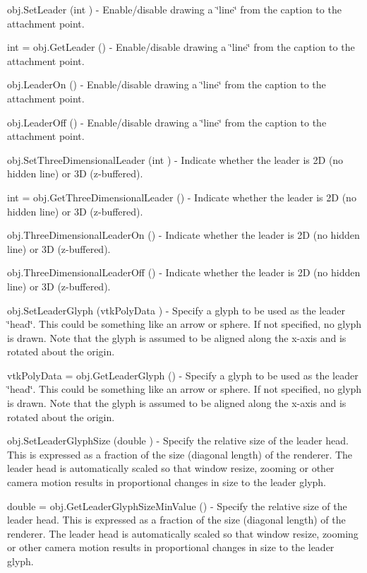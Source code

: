 \begin{DoxyItemize}
\item {\ttfamily obj.\-Set\-Leader (int )} -\/ Enable/disable drawing a \char`\"{}line\char`\"{} from the caption to the attachment point.  
\item {\ttfamily int = obj.\-Get\-Leader ()} -\/ Enable/disable drawing a \char`\"{}line\char`\"{} from the caption to the attachment point.  
\item {\ttfamily obj.\-Leader\-On ()} -\/ Enable/disable drawing a \char`\"{}line\char`\"{} from the caption to the attachment point.  
\item {\ttfamily obj.\-Leader\-Off ()} -\/ Enable/disable drawing a \char`\"{}line\char`\"{} from the caption to the attachment point.  
\item {\ttfamily obj.\-Set\-Three\-Dimensional\-Leader (int )} -\/ Indicate whether the leader is 2\-D (no hidden line) or 3\-D (z-\/buffered).  
\item {\ttfamily int = obj.\-Get\-Three\-Dimensional\-Leader ()} -\/ Indicate whether the leader is 2\-D (no hidden line) or 3\-D (z-\/buffered).  
\item {\ttfamily obj.\-Three\-Dimensional\-Leader\-On ()} -\/ Indicate whether the leader is 2\-D (no hidden line) or 3\-D (z-\/buffered).  
\item {\ttfamily obj.\-Three\-Dimensional\-Leader\-Off ()} -\/ Indicate whether the leader is 2\-D (no hidden line) or 3\-D (z-\/buffered).  
\item {\ttfamily obj.\-Set\-Leader\-Glyph (vtk\-Poly\-Data )} -\/ Specify a glyph to be used as the leader \char`\"{}head\char`\"{}. This could be something like an arrow or sphere. If not specified, no glyph is drawn. Note that the glyph is assumed to be aligned along the x-\/axis and is rotated about the origin.  
\item {\ttfamily vtk\-Poly\-Data = obj.\-Get\-Leader\-Glyph ()} -\/ Specify a glyph to be used as the leader \char`\"{}head\char`\"{}. This could be something like an arrow or sphere. If not specified, no glyph is drawn. Note that the glyph is assumed to be aligned along the x-\/axis and is rotated about the origin.  
\item {\ttfamily obj.\-Set\-Leader\-Glyph\-Size (double )} -\/ Specify the relative size of the leader head. This is expressed as a fraction of the size (diagonal length) of the renderer. The leader head is automatically scaled so that window resize, zooming or other camera motion results in proportional changes in size to the leader glyph.  
\item {\ttfamily double = obj.\-Get\-Leader\-Glyph\-Size\-Min\-Value ()} -\/ Specify the relative size of the leader head. This is expressed as a fraction of the size (diagonal length) of the renderer. The leader head is automatically scaled so that window resize, zooming or other camera motion results in proportional changes in size to the leader glyph.  

\end{DoxyItemize}

